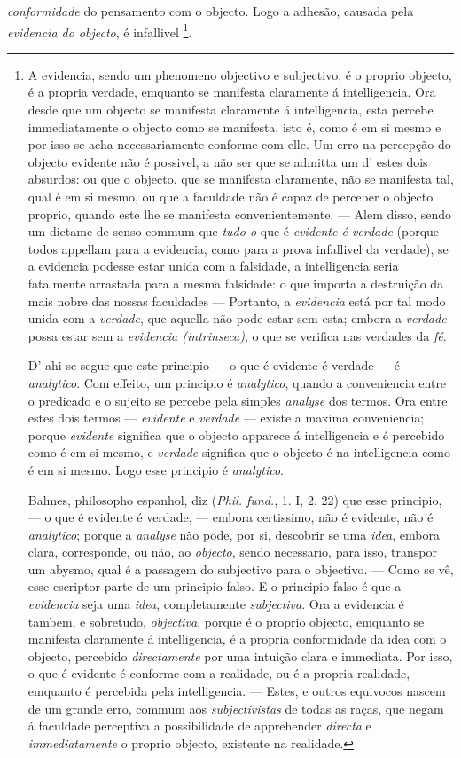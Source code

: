 \emph{conformidade} do pensamento com o objecto. Logo a adhesão, causada pela \emph{evidencia do objecto}, é infallivel \footnote{A evidencia, sendo um phenomeno objectivo e subjectivo, é o proprio objecto, é a propria verdade, emquanto se manifesta claramente á intelligencia. Ora desde que um objecto se manifesta claramente á intelligencia, esta percebe immediatamente o objecto como se manifesta, isto é, como é em si mesmo e por isso se acha necessariamente conforme com elle. Um erro na percepção do objecto evidente não é possivel, a não ser que se admitta um d' estes dois absurdos: ou que o objecto, que se manifesta claramente, não se manifesta tal, qual é em si mesmo, ou que a faculdade não é capaz de perceber o objecto proprio, quando este lhe se manifesta convenientemente. --- Alem disso, sendo um dictame de senso commum que \emph{tudo o} que é \emph{evidente é verdade} (porque todos appellam para a evidencia, como para a prova infallivel da verdade), se a evidencia podesse estar unida com a falsidade, a intelligencia seria fatalmente arrastada para a mesma falsidade: o que importa a destruição da mais nobre das nossas faculdades --- Portanto, a \emph{evidencia} está por tal modo unida com a \emph{verdade}, que aquella não pode estar sem esta; embora a \emph{verdade} possa estar sem a \emph{evidencia (intrinseca)}, o que se verifica nas verdades da \emph{fé}.\par D' ahi se segue que este principio --- o que é evidente é verdade --- é \emph{analytico}. Com effeito, um principio é \emph{analytico}, quando a conveniencia entre o predicado e o sujeito se percebe pela simples \emph{analyse} dos termos. Ora entre estes dois termos --- \emph{evidente} e \emph{verdade} --- existe a maxima conveniencia; porque \emph{evidente} significa que o objecto apparece á intelligencia e é percebido como é em si mesmo, e \emph{verdade} significa que o objecto é na intelligencia como é em si mesmo. Logo esse principio é \emph{analytico}.\par Balmes, philosopho espanhol, diz (\emph{Phil. fund.}, 1. I, 2. 22) que esse principio, --- o que é evidente é verdade, --- embora certissimo, não é evidente, não é \emph{analytico}; porque a \emph{analyse} não pode, por si, descobrir se uma \emph{idea}, embora clara, corresponde, ou não, ao \emph{objecto}, sendo necessario, para isso, transpor um abysmo, qual é a passagem do subjectivo para o objectivo. --- Como se vê, esse escriptor parte de um principio falso. E o principio falso é que a \emph{evidencia} seja uma \emph{idea}, completamente \emph{subjectiva}. Ora a evidencia é tambem, e sobretudo, \emph{objectiva}, porque é o proprio objecto, emquanto se manifesta claramente á intelligencia, é a propria conformidade da idea com o objecto, percebido \emph{directamente} por uma intuição clara e immediata. Por isso, o que é evidente é conforme com a realidade, ou é a propria realidade, emquanto é percebida pela intelligencia. --- Estes, e outros equivocos nascem de um grande erro, commum aos \emph{subjectivistas} de todas as raças, que negam á faculdade perceptiva a possibilidade de apprehender \emph{directa} e \emph{immediatamente} o proprio objecto, existente na realidade.}.

